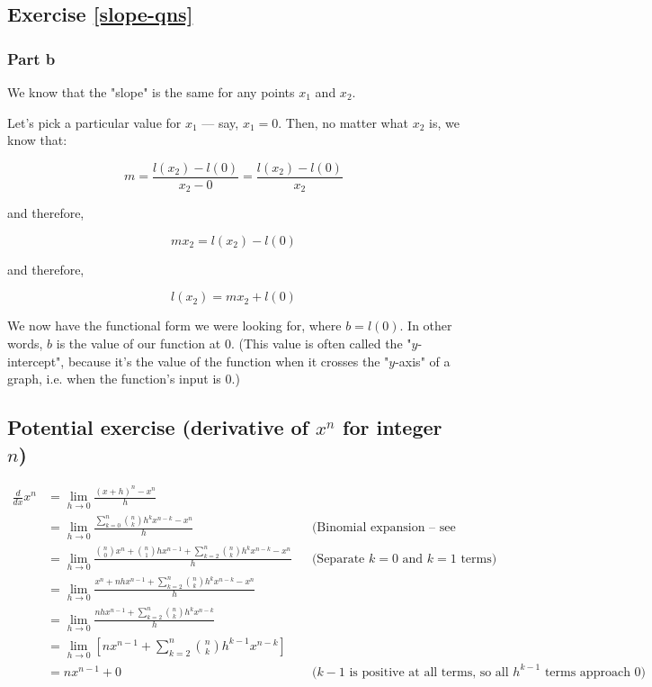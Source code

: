 \subsection{Exercise \ref{slope-qns}}

\subsubsection{Part b}

We know that the "slope" is the same for any points $x_1$ and $x_2$. 

Let's pick a particular value for $x_1$ --- say, $x_1 = 0$. Then, no matter what $x_2$ is, we know that:

\begin{equation*}
m = \frac{l(x_2) - l(0)}{x_2 - 0} = \frac{l(x_2) - l(0)}{x_2}
\end{equation*}

and therefore, 

\begin{equation*}
m x_2 = l(x_2) - l(0)
\end{equation*}

and therefore, 

\begin{equation*}
l(x_2) = m x_2 + l(0)
\end{equation*}

We now have the functional form we were looking for, where $b = l(0)$. In other words, $b$ is the value of our function at 0. (This value is often called the "$y$-intercept", because it's the value of the function when it crosses the "$y$-axis" of a graph, i.e. when the function's input is 0.)


\subsection{Potential exercise (derivative of $x^n$ for integer $n$)}

\begin{align*}
\frac{d}{dx}x^n &= \lim_{h \rightarrow 0} \frac{(x+h)^n - x^n}{h} \\
&= \lim_{h \rightarrow 0} \frac{\sum_{k=0}^n \binom{n}{k}h^k x^{n-k} - x^n}{h} && \text{(Binomial expansion -- see chapter)} \\
&= \lim_{h \rightarrow 0} \frac{\binom{n}{0}x^n + \binom{n}{1}hx^{n-1} + \sum_{k=2}^n \binom{n}{k}h^k x^{n-k} - x^n}{h} && \text{(Separate $k=0$ and $k=1$ terms)} \\
&= \lim_{h \rightarrow 0} \frac{x^n + nhx^{n-1} + \sum_{k=2}^n \binom{n}{k}h^k x^{n-k} - x^n}{h} \\
&= \lim_{h \rightarrow 0} \frac{nhx^{n-1} + \sum_{k=2}^n \binom{n}{k}h^k x^{n-k}}{h} \\
&= \lim_{h \rightarrow 0} \left[nx^{n-1} + \sum_{k=2}^n \binom{n}{k}h^{k-1} x^{n-k}\right] \\
&= nx^{n-1} + 0 && \text{($k-1$ is positive at all terms, so all $h^{k-1}$ terms approach 0)}\\
\end{align*}

